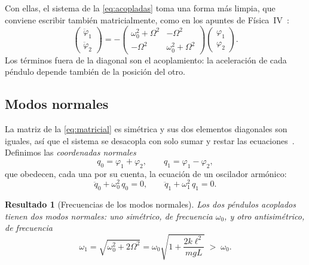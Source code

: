\documentclass[a4paper,11pt]{amsart}
\numberwithin{equation}{section}
\newcommand{\wz}{\omega_0}                    %
\newcommand{\wu}{\omega_1}                    %
\theoremstyle{cienplano}
\newtheorem{resultado}[proposicion]{Resultado}
\theoremstyle{ciendef}
\theoremstyle{cienobs}
\begin{document}
Con ellas, el sistema de la \cref{eq:acopladas} toma una forma más limpia, que conviene
escribir también matricialmente, como en los apuntes de Física~IV~\cite{FIV}:
\begin{equation}\label{eq:matricial}
  \begin{pmatrix}\ddot\varphi_1\\ \ddot\varphi_2\end{pmatrix}
  =-\begin{pmatrix}\wz^{2}+\Omega^{2} & -\Omega^{2}\\
                   -\Omega^{2} & \wz^{2}+\Omega^{2}\end{pmatrix}
   \begin{pmatrix}\varphi_1\\ \varphi_2\end{pmatrix}.
\end{equation}
Los términos fuera de la diagonal son el acoplamiento: la aceleración de cada
péndulo depende también de la posición del otro.

\subsection{Modos normales}\label{sec:modos}
La matriz de la \cref{eq:matricial} es simétrica y sus dos elementos
diagonales son iguales, así que el sistema se desacopla con solo sumar y
restar las ecuaciones~\cite{FIV}. Definimos las \emph{coordenadas normales}
\begin{equation}\label{eq:coordnormales}
  q_0=\varphi_1+\varphi_2,
  \qquad
  q_1=\varphi_1-\varphi_2,
\end{equation}
que obedecen, cada una por su cuenta, la ecuación de un oscilador armónico:
\begin{equation}\label{eq:desacopladas}
  \ddot q_0+\wz^{2}\,q_0=0,
  \qquad
  \ddot q_1+\wu^{2}\,q_1=0 .
\end{equation}

\begin{resultado}[Frecuencias de los modos normales]\label{res:modos}
Los dos péndulos acoplados tienen dos modos normales: uno simétrico, de
frecuencia $\wz$, y otro antisimétrico, de frecuencia
\begin{equation}\label{eq:modos}
  \wu=\sqrt{\wz^{2}+2\Omega^{2}}
     =\wz\sqrt{1+\frac{2k\ell^{2}}{mgL}}\;>\;\wz .
\end{equation}
\end{resultado}
\end{document}
